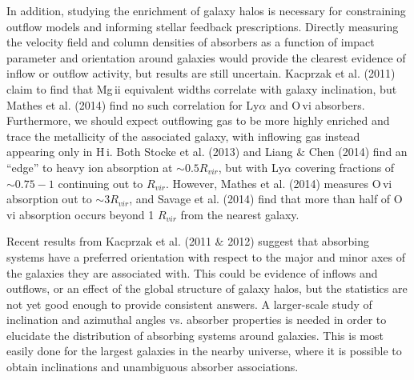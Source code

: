\documentclass[iop]{emulateapj-rtx4}
\begin{document}
In addition, studying the enrichment of galaxy halos is necessary for constraining outflow models and informing stellar feedback prescriptions. Directly measuring the velocity field and column densities of absorbers as a function of impact parameter and orientation around galaxies would provide the clearest evidence of inflow or outflow activity, but results are still uncertain. Kacprzak et al. (2011) claim to find that Mg\,{\sc ii} equivalent widths correlate with galaxy inclination, but Mathes et al. (2014) find no such correlation for Ly$\alpha$ and O\,{\sc vi} absorbers. Furthermore, we should expect outflowing gas to be more highly enriched and trace the metallicity of the associated galaxy, with inflowing gas instead appearing only in H\,{\sc i}. Both Stocke et al. (2013) and Liang $\&$ Chen (2014) find an ``edge'' to heavy ion absorption at $\sim0.5R_{vir}$, but with Ly$\alpha$ covering fractions of $\sim0.75-1$ continuing out to $R_{vir}$. However, Mathes et al. (2014) measures O\,{\sc vi} absorption out to $\sim3 R_{vir}$, and Savage et al. (2014) find that more than half of O\,{\sc vi} absorption occurs beyond 1 $R_{vir}$ from the nearest galaxy.



Recent results from Kacprzak et al. (2011 $\&$ 2012) suggest that absorbing systems have a preferred orientation with respect to the major and minor axes of the galaxies they are associated with. This could be evidence of inflows and outflows, or an effect of the global structure of galaxy halos, but the statistics are not yet good enough to provide consistent answers. A larger-scale study of inclination and azimuthal angles vs. absorber properties is needed in order to elucidate the distribution of absorbing systems around galaxies. This is most easily done for the largest galaxies in the nearby universe, where it is possible to obtain inclinations and unambiguous absorber associations. 
\end{document}
